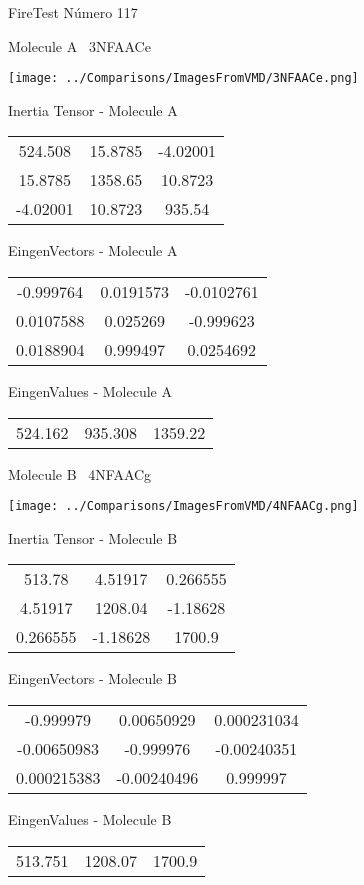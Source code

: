\vtab[-3cm]
\begin{center}
{\large FireTest \tab Número 117}
\end{center}
\begin{multicols}{2}
\begin{center}

Molecule A \
3NFAACe

\texttt{[image: ../Comparisons/ImagesFromVMD/3NFAACe.png]}

Inertia Tensor - Molecule A \\
\begin{tabular}{|c c c|}
524.508	 & 	15.8785	 & 	-4.02001	 \\
15.8785	 & 	1358.65	 & 	10.8723	 \\
-4.02001	 & 	10.8723	 & 	935.54
\end{tabular}

\vtab
 EingenVectors - Molecule A     \\
\begin{tabular}{|c c c|}
-0.999764	 & 	0.0191573	 & 	-0.0102761	 \\
0.0107588	 & 	0.025269	 & 	-0.999623	 \\
0.0188904	 & 	0.999497	 & 	0.0254692
\end{tabular}

\vtab
 EingenValues - Molecule A     \\
\begin{tabular}{|c c c|}
524.162	 & 	935.308	 & 	1359.22	 \\
\end{tabular}
\columnbreak

Molecule B \
4NFAACg

\texttt{[image: ../Comparisons/ImagesFromVMD/4NFAACg.png]}

Inertia Tensor - Molecule B \\
\begin{tabular}{|c c c|}
513.78	 & 	4.51917	 & 	0.266555	 \\
4.51917	 & 	1208.04	 & 	-1.18628	 \\
0.266555	 & 	-1.18628	 & 	1700.9
\end{tabular}

\vtab
 EingenVectors - Molecule B     \\
\begin{tabular}{|c c c|}
-0.999979	 & 	0.00650929	 & 	0.000231034	 \\
-0.00650983	 & 	-0.999976	 & 	-0.00240351	 \\
0.000215383	 & 	-0.00240496	 & 	0.999997
\end{tabular}

\vtab
 EingenValues - Molecule B     \\
\begin{tabular}{|c c c|}
513.751	 & 	1208.07	 & 	1700.9	 \\
\end{tabular}

\end{center}
\end{multicols}


